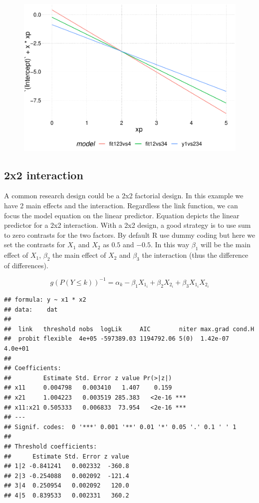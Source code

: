 \documentclass[
  man,floatsintext]{apa6}
\begin{document}
\begin{figure}

{\centering \includegraphics{paper-new_files/figure-latex/unnamed-chunk-22-1} 

}

\caption{ }\label{fig:unnamed-chunk-22}
\end{figure}

\normalsize

\subsection{2x2 interaction}\label{x2-interaction}

A common research design could be a 2x2 factorial design. In this example we have 2 main effects and the interaction. Regardless the link function, we can focus the model equation on the linear predictor. Equation depicts the linear predictor for a 2x2 interaction. With a 2x2 design, a good strategy is to use sum to zero contrasts for the two factors. By default R use dummy coding but here we set the contrasts for \(X_1\) and \(X_2\) as \(0.5\) and \(-0.5\). In this way \(\beta_1\) will be the main effect of \(X_1\), \(\beta_2\) the main effect of \(X_2\) and \(\beta_3\) the interaction (thus the difference of differences).

\[
g(P(Y \leq k))^{-1} = \alpha_k - \beta_1X_{1_i} + \beta_2X_{2_i} + \beta_3X_{1_i}X_{2_i}
\]

\scriptsize

\begin{verbatim}
## formula: y ~ x1 * x2
## data:    dat
## 
##  link   threshold nobs  logLik     AIC        niter max.grad cond.H 
##  probit flexible  4e+05 -597389.03 1194792.06 5(0)  1.42e-07 4.0e+01
## 
## Coefficients:
##         Estimate Std. Error z value Pr(>|z|)    
## x11     0.004798   0.003410   1.407    0.159    
## x21     1.004223   0.003519 285.383   <2e-16 ***
## x11:x21 0.505333   0.006833  73.954   <2e-16 ***
## ---
## Signif. codes:  0 '***' 0.001 '**' 0.01 '*' 0.05 '.' 0.1 ' ' 1
## 
## Threshold coefficients:
##      Estimate Std. Error z value
## 1|2 -0.841241   0.002332  -360.8
## 2|3 -0.254088   0.002092  -121.4
## 3|4  0.250954   0.002092   120.0
## 4|5  0.839533   0.002331   360.2
\end{verbatim}
\end{document}
